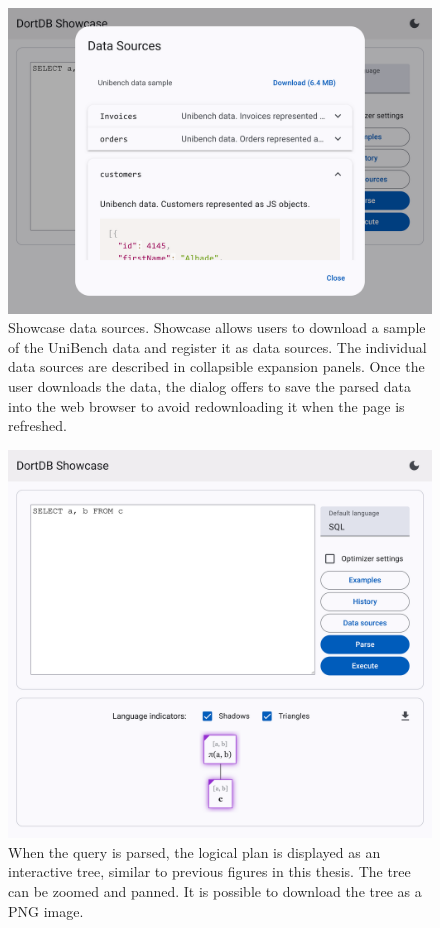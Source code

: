 \begin{figure}[!h]
    \centering
    \includegraphics[width=0.8\linewidth]{img/showcase_data_sources.png}
    \caption{Showcase data sources. Showcase allows users to download a sample of the UniBench data and register it as data sources. The individual data sources are described in collapsible expansion panels. Once the user downloads the data, the dialog offers to save the parsed data into the web browser to avoid redownloading it when the page is refreshed.}
\end{figure}

\begin{figure}[!h]
    \centering
    \includegraphics[width=0.8\linewidth]{img/showcase_parse.png}
    \caption{When the query is parsed, the logical plan is displayed as an interactive tree, similar to previous figures in this thesis. The tree can be zoomed and panned. It is possible to download the tree as a PNG image.}
\end{figure}

